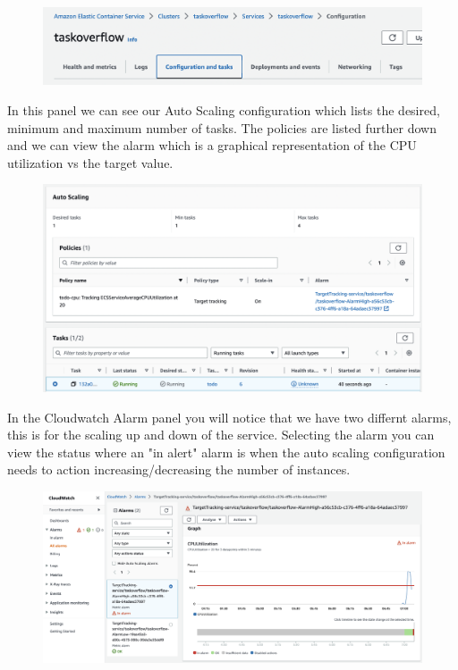 \documentclass{csse4400}
\begin{document}
\begin{figure}[H]
  \begin{center}
    \includegraphics[width=\textwidth]{images/ecs1}
  \end{center}
\end{figure}

In this panel we can see our Auto Scaling configuration which lists the desired, minimum and maximum number of tasks. The policies are listed further down and we can view the alarm which is a graphical representation of the CPU utilization vs the target value.

\begin{figure}[H]
  \begin{center}
    \includegraphics[width=\textwidth]{images/ecs2}
  \end{center}
\end{figure}

In the Cloudwatch Alarm panel you will notice that we have two differnt alarms, this is for the scaling up and down of the service. Selecting the alarm you can view the status where an "in alert" alarm is when the auto scaling configuration needs to action increasing/decreasing the number of instances.

\begin{figure}[H]
  \begin{center}
    \includegraphics[width=\textwidth]{images/ecs3}
  \end{center}
\end{figure}



\end{document}
